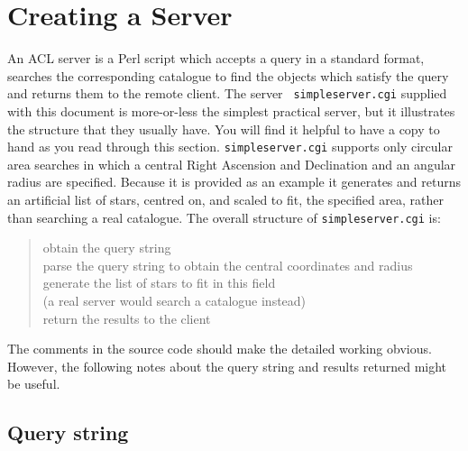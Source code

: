 \documentclass[twoside,11pt]{article}
\newcommand{\xlabel}[1]{}
\renewcommand{\_}{\texttt{\symbol{95}}}
\begin{document}
\section{\xlabel{SERVER_T}\label{SERVER_T}Creating a Server}

An ACL server is a Perl script which accepts a query in a standard format,
searches the corresponding catalogue to find the objects which satisfy
the query and returns them to the remote client.  The server {\tt
simpleserver.cgi} supplied with this document is more-or-less the simplest
practical server, but it illustrates the structure that they usually have.
You will find it helpful to have a copy to hand as you read through this
section.  {\tt simpleserver.cgi} supports only circular area searches
in which a central Right Ascension and Declination and an angular radius
are specified.  Because it is provided as an example it generates and
returns an artificial list of stars, centred on, and scaled to fit, the
specified area, rather than searching a real catalogue.  The overall
structure of {\tt simpleserver.cgi} is:

\begin{quote}
obtain the query string \\
parse the query string to obtain the central coordinates and radius \\
generate the list of stars to fit in this field \\
\hspace*{3 mm} (a real server would search a catalogue instead) \\
return the results to the client
\end{quote}

The comments in the source code should make the detailed working obvious.
However, the following notes about the query string and results returned
might be useful.

\subsection{Query string}
\end{document}
